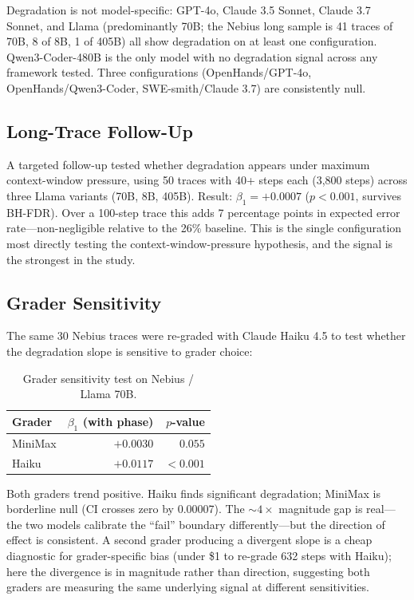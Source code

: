 \documentclass[11pt]{article}
\begin{document}
Degradation is not model-specific: GPT-4o, Claude 3.5 Sonnet, Claude 3.7 Sonnet, and Llama (predominantly 70B; the Nebius long sample is 41 traces of 70B, 8 of 8B, 1 of 405B) all show degradation on at least one configuration.
Qwen3-Coder-480B is the only model with no degradation signal across any framework tested.
Three configurations (OpenHands/GPT-4o, OpenHands/Qwen3-Coder, SWE-smith/Claude 3.7) are consistently null.

\subsection{Long-Trace Follow-Up}

A targeted follow-up tested whether degradation appears under maximum context-window pressure, using 50 traces with 40+ steps each (3,800 steps) across three Llama variants (70B, 8B, 405B).
Result: $\beta_1 = +0.0007$ ($p < 0.001$, survives BH-FDR).
Over a 100-step trace this adds 7 percentage points in expected error rate---non-negligible relative to the 26\% baseline.
This is the single configuration most directly testing the context-window-pressure hypothesis, and the signal is the strongest in the study.

\subsection{Grader Sensitivity}

The same 30 Nebius traces were re-graded with Claude Haiku 4.5 to test whether the degradation slope is sensitive to grader choice:

\begin{table}[h]
\centering
\caption{Grader sensitivity test on Nebius / Llama 70B.}
\label{tab:sensitivity}
\begin{tabular}{lrr}
\toprule
Grader & $\beta_1$ (with phase) & $p$-value \\
\midrule
MiniMax & $+0.0030$ & $0.055$ \\
Haiku & $+0.0117$ & $< 0.001$ \\
\bottomrule
\end{tabular}
\end{table}

Both graders trend positive.
Haiku finds significant degradation; MiniMax is borderline null (CI crosses zero by 0.00007).
The ${\sim}4\times$ magnitude gap is real---the two models calibrate the ``fail'' boundary differently---but the direction of effect is consistent.
A second grader producing a divergent slope is a cheap diagnostic for grader-specific bias (under \$1 to re-grade 632 steps with Haiku); here the divergence is in magnitude rather than direction, suggesting both graders are measuring the same underlying signal at different sensitivities.
\end{document}

